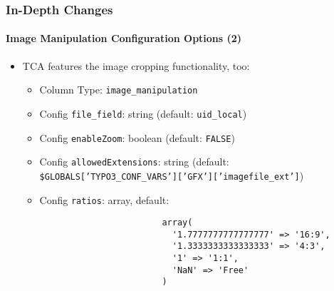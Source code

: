 \begin{frame}[fragile]
	\frametitle{In-Depth Changes}
	\framesubtitle{Image Manipulation Configuration Options (2)}

	\lstset{basicstyle=\smaller\ttfamily}

	\begin{itemize}
		\item TCA features the image cropping functionality, too:

			\begin{itemize}
				\item Column Type: \texttt{image\_manipulation}
				\item Config \texttt{file\_field}: string	\tabto{5.6cm}(default: \texttt{uid\_local})
				\item Config \texttt{enableZoom}: boolean	\tabto{5.6cm}(default: \texttt{FALSE})
				\item Config \texttt{allowedExtensions}: string\newline
					(default: \smaller\texttt{\$GLOBALS['TYPO3\_CONF\_VARS']['GFX']['imagefile\_ext']}\small)
				\item Config \texttt{ratios}: array, default:

					\begin{lstlisting}
						array(
						  '1.7777777777777777' => '16:9',
						  '1.3333333333333333' => '4:3',
						  '1' => '1:1',
						  'NaN' => 'Free'
						)
					\end{lstlisting}
			\end{itemize}

	\end{itemize}

\end{frame}

